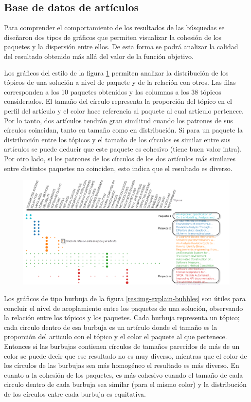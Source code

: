 \subsection{Base de datos de artículos}
Para comprender el comportamiento de los resultados de las búsquedas se diseñaron dos tipos de gráficos que permiten visualizar la cohesión de los paquetes y la dispersión entre ellos. De esta forma se podrá analizar la calidad del resultado obtenido más allá del valor de la función objetivo.

Los gráficos del estilo de la figura \ref{res:img-explain-bars} permiten analizar la distribución de los tópicos de una solución a nivel de paquete y de la relación con otros. Las filas corresponden a los 10 paquetes obtenidos y las columnas a los 38 tópicos considerados. El tamaño del círculo representa la proporción del tópico en el perfil del artículo y el color hace referencia al paquete al cual artículo pertenece. Por lo tanto, dos artículos tendrán gran similitud cuando los patrones de sus círculos coincidan, tanto en tamaño como en distribución. Si para un paquete la distribución entre los tópicos y el tamaño de los círculos es similar entre sus artículos se puede deducir que este paquete es cohesivo (tiene buen valor intra). Por otro lado, si los patrones de los círculos de los dos artículos más similares entre distintos paquetes no coinciden, esto indica que el resultado es diverso.
\begin{figure}[H]
  \centering
    \includegraphics[width=1\textwidth]{img/explain-bars.png}
  \caption{}
  \label{res:img-explain-bars}
\end{figure}

Los gráficos de tipo burbuja de la figura \ref{res:img-explain-bubbles} son útiles para concluir el nivel de acoplamiento entre los paquetes de una solución, observando la relación entre los tópicos y los paquetes. Cada burbuja representa un tópico; cada circulo dentro de esa burbuja es un artículo donde el tamaño es la proporción del articulo con el tópico y el color el paquete al que pertenece. Entonces si las burbujas contienen círculos de tamaños parecidos de más de un color se puede decir que ese resultado no es muy diverso, mientras que el color de los círculos de las burbujas sea más homogéneo el resultado es más diverso. En cuanto a la cohesión de los paquetes, es más cohesivo cuando el tamaño de cada circulo dentro de cada burbuja sea similar (para el mismo color) y la distribución de los círculos entre cada burbuja es equitativa.

